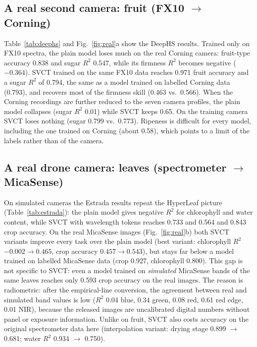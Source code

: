 \documentclass[preprint,12pt,authoryear]{elsarticle}
\begin{document}
\begin{table}[t]
\centering\small
\setlength{\tabcolsep}{4pt}
\caption{Plot-grouped cross-validation on HyperLeaf2024 (mean $\pm$ s.d.\ over folds of the mean over the seven held-out
cameras).}
\label{tab:cv}

\end{table}

\subsection{A real second camera: fruit (FX10 $\rightarrow$ Corning)}
Table~\ref{tab:deephs} and Fig.~\ref{fig:real}a show the DeepHS results. Trained only on FX10 spectra, the plain model
loses much on the real Corning camera: fruit-type accuracy 0.838 and sugar $R^2$ 0.547, while its firmness $R^2$ becomes
negative ($-0.364$). SVCT trained on the same FX10 data reaches 0.971 fruit accuracy and a sugar $R^2$ of 0.794, the same
as a model trained on labelled Corning data (0.793), and recovers most of the firmness skill (0.463 vs.\ 0.566). When the
Corning recordings are further reduced to the seven camera profiles, the plain model collapses (sugar $R^2$ 0.01) while
SVCT keeps 0.65. On the training camera SVCT loses nothing (sugar 0.799 vs.\ 0.773). Ripeness is difficult for every
model, including the one trained on Corning (about 0.58), which points to a limit of the labels rather than of the
camera.

\begin{table}[t]
\centering\scriptsize
\setlength{\tabcolsep}{4pt}
\caption{DeepHS fruit: models trained on Specim FX10 spectra, tested on unseen fruits (fruit-grouped 5-fold CV
$\times$ 3 seeds, mean $\pm$ s.d.). $^\ast$Trained on labelled Corning recordings.}
\label{tab:deephs}

\end{table}

\subsection{A real drone camera: leaves (spectrometer $\rightarrow$ MicaSense)}
On simulated cameras the Estrada results repeat the HyperLeaf picture (Table~\ref{tab:estrada}): the plain model gives
negative $R^2$ for chlorophyll and water content, while SVCT with wavelength tokens reaches 0.733 and 0.564 and 0.843
crop accuracy. On the real MicaSense images (Fig.~\ref{fig:real}b) both SVCT variants improve every task over the plain model
(best variant: chlorophyll $R^2$ $-0.002\rightarrow0.465$, crop accuracy $0.457\rightarrow0.543$), but stays far below a model trained
on labelled MicaSense data (crop 0.927, chlorophyll 0.800). This gap is not specific to SVCT: even a model trained on
\emph{simulated} MicaSense bands of the same leaves reaches only 0.593 crop accuracy on the real images. The reason is
radiometric: after the empirical-line conversion, the agreement between real and simulated band values is low
($R^2$ 0.04 blue, 0.34 green, 0.08 red, 0.61 red edge, 0.01 NIR), because the released images are uncalibrated digital
numbers without panel or exposure information. Unlike on fruit, SVCT also costs accuracy on the original spectrometer
data here (interpolation variant: drying stage 0.899 $\rightarrow$ 0.681; water $R^2$ 0.934 $\rightarrow$ 0.750).
\end{document}
